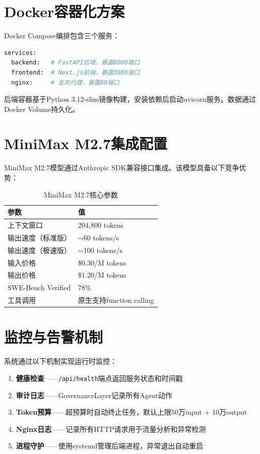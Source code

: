 \documentclass[12pt,a4paper]{ctexrep}
\begin{document}
\section{Docker容器化方案}

Docker Compose编排包含三个服务：

\begin{lstlisting}[language=bash,caption=Docker Compose服务编排]
services:
  backend:   # FastAPI后端，暴露8000端口
  frontend:  # Next.js前端，暴露3000端口
  nginx:     # 反向代理，暴露80端口
\end{lstlisting}

后端容器基于Python 3.12-slim镜像构建，安装依赖后启动uvicorn服务。数据通过Docker Volume持久化。

\section{MiniMax M2.7集成配置}

MiniMax M2.7模型通过Anthropic SDK兼容接口集成。该模型具备以下竞争优势：

\begin{table}[H]
\centering
\caption{MiniMax M2.7核心参数}
\begin{tabular}{ll}
\toprule
\textbf{参数} & \textbf{值} \\
\midrule
上下文窗口 & 204,800 tokens \\
输出速度（标准版） & $\sim$60 tokens/s \\
输出速度（极速版） & $\sim$100 tokens/s \\
输入价格 & \$0.30/M tokens \\
输出价格 & \$1.20/M tokens \\
SWE-Bench Verified & 78\% \\
工具调用 & 原生支持function calling \\
\bottomrule
\end{tabular}
\end{table}

\section{监控与告警机制}

系统通过以下机制实现运行时监控：

\begin{enumerate}
\item \textbf{健康检查}——\texttt{/api/health}端点返回服务状态和时间戳
\item \textbf{审计日志}——GovernanceLayer记录所有Agent动作
\item \textbf{Token预算}——超预算时自动终止任务，默认上限50万input + 10万output
\item \textbf{Nginx日志}——记录所有HTTP请求用于流量分析和异常检测
\item \textbf{进程守护}——使用systemd管理后端进程，异常退出自动重启
\end{enumerate}
\end{document}

